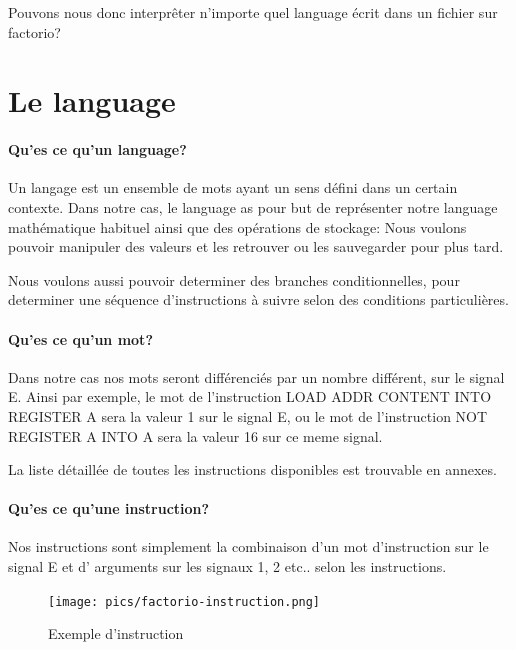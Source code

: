 \documentclass{scrreprt}
\begin{document}
	
	\begin{problem}
		Pouvons nous donc interprêter n'importe quel language écrit dans un fichier sur factorio?
	\end{problem}
	
	\section{Le language}
	
	\paragraph{Qu'es ce qu'un language?}
	Un langage est un ensemble de mots ayant un sens défini dans un certain contexte.
	Dans notre cas, le language as pour but de représenter notre language mathématique habituel ainsi que des opérations de stockage: Nous voulons pouvoir manipuler des valeurs et les retrouver ou les sauvegarder pour plus tard.
	
	Nous voulons aussi pouvoir determiner des branches conditionnelles, pour determiner une séquence d'instructions à suivre selon des conditions particulières.
	
	\paragraph{Qu'es ce qu'un mot?}
	Dans notre cas nos mots seront différenciés par un nombre différent, sur le signal E.
	Ainsi par exemple, le mot de l'instruction LOAD ADDR CONTENT INTO REGISTER A sera la valeur 1 sur le signal E, ou le mot de  l'instruction NOT REGISTER A INTO A sera la valeur 16 sur ce meme signal.
	
	\begin{info}
		La liste détaillée de toutes les instructions disponibles est trouvable en annexes.
	\end{info}
	
	\paragraph{Qu'es ce qu'une instruction?}
	Nos instructions sont simplement la combinaison d'un mot d'instruction sur le signal E et d' arguments sur les signaux 1, 2 etc.. selon les instructions.
	
	\begin{figure}[h]
		\centering
		\texttt{[image: pics/factorio-instruction.png]}
		
		\caption{Exemple d'instruction}
	\end{figure}
	
\end{document}
